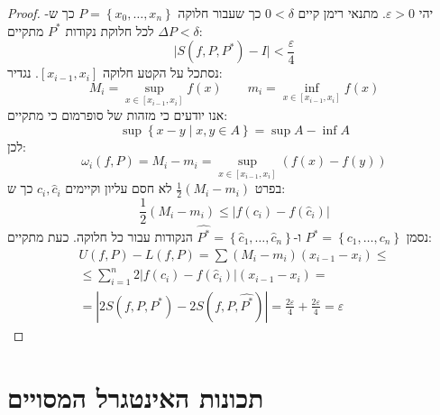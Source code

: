 \documentclass{tstextbook}
\begin{document}
\begin{proof}
יהי \(\varepsilon> 0\). מתנאי רימן קיים \(0< \delta\) כך שעבור חלוקה \(P=\left\{  x_{0},\dots,x_{n}  \right\}\) כך ש-\(\Delta P<\delta\) לכל חלוקת נקודות \(P^{*}\) מתקיים:
$$\lvert S(f,P,P^{*}) - I\rvert <\frac{\varepsilon}{4}$$
נסתכל על הקטע חלוקה \([x_{i-1},x_{i}]\). נגדיר:
$$M_{i}=\sup _{x \in [x_{i-1},x_{i}]} f(x)\qquad m_{i}=\inf _{x \in[x_{i-1},x_{i}]}f(x)$$
אנו יודעים כי מזהות של סופרמום כי מתקיים:
$$\sup \left\{  x-y \mid x,y \in A\right\}=\sup A-\inf A$$
לכן:
$$\omega_{i}(f,P)=M_{i}-m_{i}=\sup _{x \in[x_{i-1},x_{i}]} (f(x)-f(y))$$
בפרט \(\frac{1}{2}(M_{i}-m_{i})\) לא חסם עליון וקיימים \(c_{i},\hat{c}_{i}\) כך ש:
$$\frac{1}{2}(M_{i}-m_{i})\leq \lvert f(c_{i})-f\left( \hat{c}_{i} \right) \rvert $$
נסמן \(P^{*}=\left\{  c_{1},\dots, c_{n}  \right\}\) ו-\(\widehat{P^{*}}=\left\{  \hat{c}_{1},\dots,\hat{c}_{n}  \right\}\) הנקודות עבור כל חלוקה. כעת מתקיים:
\begin{gather*}U(f,P)-L(f,P)=\sum (M_{i}-m_{i})(x_{i-1}-x_{i})\leq \\\leq \sum_{i=1}^{n} 2\left\lvert  f(c_{i})-f\left( \hat{c}_{i} \right)  \right\rvert (x_{i-1}-x_{i})= \\=\left\lvert  2S(f,P,P^{*})-2S\left( f,P,\widehat{P^{*}}  \right)  \right\rvert = \frac{2\varepsilon}{4}+\frac{2\varepsilon}{4}=\varepsilon
\end{gather*}

\end{proof}
\section{תכונות האינטגרל המסויים}
\end{document}
